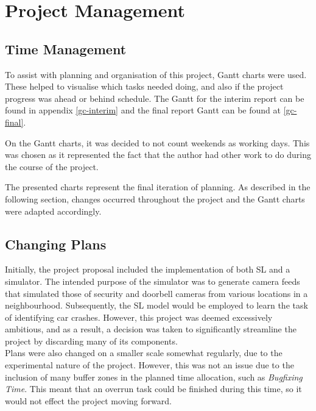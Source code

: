 \chapter{Project Management}
\section{Time Management}
To assist with planning and organisation of this project, Gantt charts were used. These helped to visualise which tasks needed doing, and also if the project progress was ahead or behind schedule. The Gantt for the interim report can be found in appendix \ref{gc-interim} and the final report Gantt can be found at \ref{gc-final}.

On the Gantt charts, it was decided to not count weekends as working days. This was chosen as it represented the fact that the author had other work to do during the course of the project. 

The presented charts represent the final iteration of planning. As described in the following section, changes occurred throughout the project and the Gantt charts were adapted accordingly.

\section{Changing Plans}
Initially, the project proposal included the implementation of both SL and a simulator. The intended purpose of the simulator was to generate camera feeds that simulated those of security and doorbell cameras from various locations in a neighbourhood. Subsequently, the SL model would be employed to learn the task of identifying car crashes. However, this project was deemed excessively ambitious, and as a result, a decision was taken to significantly streamline the project by discarding many of its components. \\

Plans were also changed on a smaller scale somewhat regularly, due to the experimental nature of the project. However, this was not an issue due to the inclusion of many buffer zones in the planned time allocation, such as \emph{Bugfixing Time}. This meant that an overrun task could be finished during this time, so it would not effect the project moving forward.

